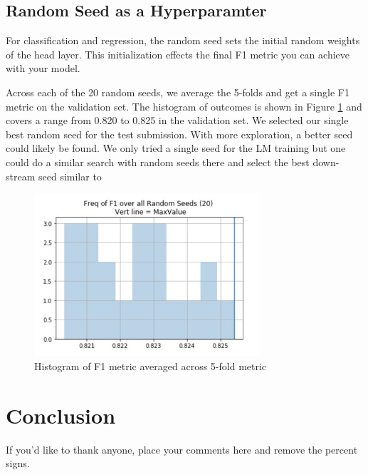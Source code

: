 \documentclass[smallcondensed]{svjour3}     %
\begin{document}
\subsection{Random Seed as a Hyperparamter}
\label{sec:rand_seeds}
For classification and regression, the random seed sets the initial random weights of the head layer. This initialization effects the final F1 metric you can achieve with your model.  

Across each of the 20 random seeds, we average the 5-folds and get a single F1 metric on the validation set.  The histogram of outcomes is shown in Figure \ref{fig:random_seed_hist} and covers a range  from 0.820 to 0.825 in the validation set. We selected our single best random seed for the test submission. With more exploration, a better seed could likely be found.  We only tried a single seed for the LM training but one could do a similar search with random seeds there and select the best down-stream seed similar to \cite{poleval}

\begin{figure}[h]
	\includegraphics[width=0.75\textwidth]{seed_hist_f1}
	\caption{Histogram of F1 metric averaged across 5-fold metric}
	\label{fig:random_seed_hist}
\end{figure}


\section{Conclusion}
\label{sec:5}


\begin{acknowledgements}
If you'd like to thank anyone, place your comments here
and remove the percent signs.
\end{acknowledgements}
\end{document}
